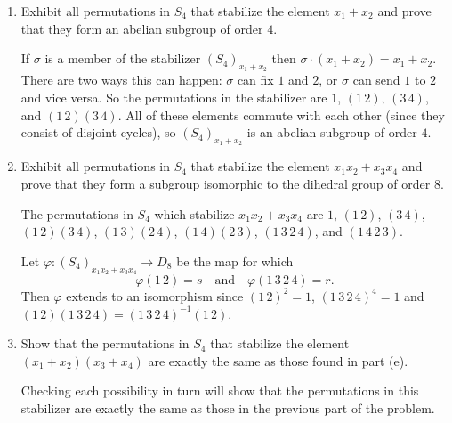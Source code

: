 \begin{enumerate}
\item Exhibit all permutations in $S_4$ that stabilize the element
  $x_1 + x_2$ and prove that they form an abelian subgroup of order
  $4$.
  \begin{solution}
    If $\sigma$ is a member of the stabilizer $(S_4)_{x_1+x_2}$ then
    $\sigma\cdot(x_1 + x_2) = x_1 + x_2$. There are two ways this can
    happen: $\sigma$ can fix $1$ and $2$, or $\sigma$ can send $1$ to
    $2$ and vice versa. So the permutations in the stabilizer are $1$,
    $(1\,2)$, $(3\,4)$, and $(1\,2)(3\,4)$. All of these elements
    commute with each other (since they consist of disjoint cycles),
    so $(S_4)_{x_1+x_2}$ is an abelian subgroup of order $4$.
  \end{solution}
\item Exhibit all permutations in $S_4$ that stabilize the element
  $x_1x_2 + x_3x_4$ and prove that they form a subgroup isomorphic to
  the dihedral group of order $8$.
  \begin{solution}
    The permutations in $S_4$ which stabilize $x_1x_2 + x_3x_4$ are
    $1$, $(1\,2)$, $(3\,4)$, $(1\,2)(3\,4)$, $(1\,3)(2\,4)$,
    $(1\,4)(2\,3)$, $(1\,3\,2\,4)$, and $(1\,4\,2\,3)$.

    Let $\varphi\colon (S_4)_{x_1x_2+x_3x_4}\to D_8$ be the map for
    which
    \begin{equation*}
      \varphi(1\,2) = s
      \quad\text{and}\quad
      \varphi(1\,3\,2\,4) = r.
    \end{equation*}
    Then $\varphi$ extends to an isomorphism since $(1\,2)^2 = 1$,
    $(1\,3\,2\,4)^4 = 1$ and
    $(1\,2)(1\,3\,2\,4) = (1\,3\,2\,4)^{-1}(1\,2)$.
  \end{solution}
\item Show that the permutations in $S_4$ that stabilize the element
  $(x_1 + x_2)(x_3 + x_4)$ are exactly the same as those found in part
  (e).
  \begin{solution}
    Checking each possibility in turn will show that the permutations
    in this stabilizer are exactly the same as those in the previous
    part of the problem.
  \end{solution}
\end{enumerate}

